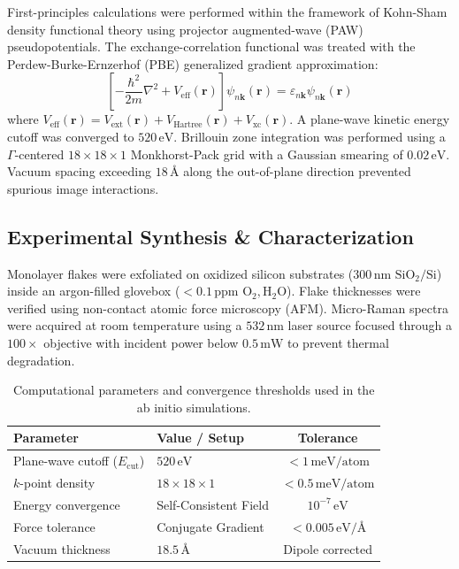 \documentclass[9pt,a4paper,twocolumn,twoside]{tau-class/tau}
\begin{document}
    First-principles calculations were performed within the framework of Kohn-Sham density functional theory \cite{davis2023signalflow} using projector augmented-wave (PAW) pseudopotentials. The exchange-correlation functional was treated with the Perdew-Burke-Ernzerhof (PBE) generalized gradient approximation:
    \begin{equation}
        \left[ -\frac{\hbar^2}{2m}\nabla^2 + V_{\text{eff}}(\mathbf{r}) \right] \psi_{n\mathbf{k}}(\mathbf{r}) = \varepsilon_{n\mathbf{k}} \psi_{n\mathbf{k}}(\mathbf{r})
        \label{eq:kohn_sham}
    \end{equation}
    where $V_{\text{eff}}(\mathbf{r}) = V_{\text{ext}}(\mathbf{r}) + V_{\text{Hartree}}(\mathbf{r}) + V_{\text{xc}}(\mathbf{r})$.
    A plane-wave kinetic energy cutoff was converged to $520\,\text{eV}$. Brillouin zone integration was performed using a $\Gamma$-centered $18 \times 18 \times 1$ Monkhorst-Pack grid with a Gaussian smearing of $0.02\,\text{eV}$. Vacuum spacing exceeding $18\,\text{\AA}$ along the out-of-plane direction prevented spurious image interactions.

    \subsection{Experimental Synthesis \& Characterization}

    Monolayer flakes were exfoliated on oxidized silicon substrates ($300\,\text{nm}$ $\text{SiO}_2/\text{Si}$) inside an argon-filled glovebox ($<0.1\,\text{ppm}$ $\text{O}_2, \text{H}_2\text{O}$). Flake thicknesses were verified using non-contact atomic force microscopy (AFM). Micro-Raman spectra were acquired at room temperature using a $532\,\text{nm}$ laser source focused through a $100\times$ objective with incident power below $0.5\,\text{mW}$ to prevent thermal degradation.

    \begin{table}[H]
        \centering
        \caption{Computational parameters and convergence thresholds used in the ab initio simulations.}
        \label{tab:params}
        \begin{tabular}{llc}
            \toprule
            \textbf{Parameter} & \textbf{Value / Setup} & \textbf{Tolerance} \\
            \midrule
            Plane-wave cutoff ($E_{\text{cut}}$) & $520\,\text{eV}$ & $< 1\,\text{meV/atom}$ \\
            $k$-point density & $18 \times 18 \times 1$ & $< 0.5\,\text{meV/atom}$ \\
            Energy convergence & Self-Consistent Field & $10^{-7}\,\text{eV}$ \\
            Force tolerance & Conjugate Gradient & $< 0.005\,\text{eV/\AA}$ \\
            Vacuum thickness & $18.5\,\text{\AA}$ & Dipole corrected \\
            \bottomrule
        \end{tabular}
    \end{table}
\end{document}
